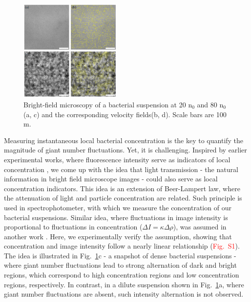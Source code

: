 \documentclass[twocolumn,aps,prl,amsmath,amssymb,longbibliography]{revtex4-2}
\begin{document}
\begin{figure}[h]
\begin{center}
\includegraphics[width=0.45\textwidth]{figures/fig-1-v2.png}
\caption[]{Bright-field microscopy of a bacterial suspension at 20 n$_0$ and 80 n$_0$ (a, c) and the corresponding velocity fields(b, d). Scale bars are 100 \textmu m.}
\label{fig:1}
\end{center}
\end{figure}

Measuring instantaneous local bacterial concentration is the key to quantify the magnitude of giant number fluctuations. Yet, it is challenging. Inspired by earlier experimental works, where fluorescence intensity serve as indicators of local concentration \cite{Schaller4488}, we come up with the idea that light transmission - the natural information in bright field microscope images - could also serve as local concentration indicators. This idea is an extension of Beer-Lampert law, where the attenuation of light and particle concentration are related. Such principle is used in spectrophotometer, with which we measure the concentration of our bacterial suspensions. Similar idea, where fluctuations in image intensity is proportional to fluctuations in concentration ($\Delta I=\kappa\Delta\rho$), was assumed in another work \cite{PhysRevLett.106.018101}. Here, we experimentally verify the assumption, showing that concentration and image intensity follow a nearly linear relationship (\textcolor{red}{Fig.~S1}). The idea is illustrated in Fig.~\ref{fig:1}c - a snapshot of dense bacterial suspensions - where giant number fluctuations lead to strong alternation of dark and bright regions, which correspond to high concentration regions and low concentration regions, respectively. In contrast, in a dilute suspension shown in Fig.~\ref{fig:1}a, where giant number fluctuations are absent, such intensity alternation is not observed.
\end{document}
